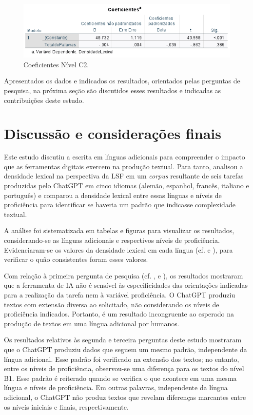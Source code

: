 \documentclass[portuguese]{textolivre}
\begin{document}
\begin{figure}[h!]
    \centering
    \includegraphics[width=0.8\linewidth]{Fig21.png}
    \caption{Coeficientes Nível C2.}
    \label{fig21}
\end{figure}

Apresentados os dados e indicados os resultados, orientados pelas perguntas de pesquisa, na próxima seção são discutidos esses resultados e indicadas as contribuições deste estudo.

\section{Discussão e considerações finais}\label{sec-formato}
Este estudo discutiu a escrita em línguas adicionais para compreender o impacto que as ferramentas digitais exercem na produção textual. Para tanto, analisou a densidade lexical na perspectiva da LSF \cite{halliday_spoken_1985,halliday_grammatical_1993} em um \textit{corpus} resultante de seis tarefas produzidas pelo ChatGPT em cinco idiomas (alemão, espanhol, francês, italiano e português) e comparou a densidade lexical entre essas línguas e níveis de proficiência para identificar se haveria um padrão que indicasse complexidade textual. 

A análise foi sistematizada em tabelas e figuras para visualizar os resultados, considerando-se as línguas adicionais e respectivos níveis de proficiência. Evidenciaram-se os valores da densidade lexical em cada língua (cf.  e ), para verificar o quão consistentes foram esses valores. 

Com relação à primeira pergunta de pesquisa (cf. ,  e ), os resultados mostraram que a ferramenta de IA não é sensível às especificidades das orientações indicadas para a realização da tarefa nem à variável proficiência. O ChatGPT produziu textos com extensão diversa ao solicitado, não considerando os níveis de proficiência indicados. Portanto, é um resultado incongruente ao esperado na produção de textos em uma língua adicional por humanos. 

Os resultados relativos às segunda e terceira perguntas deste estudo mostraram que o ChatGPT produziu dados que seguem um mesmo padrão, independente da língua adicional. Esse padrão foi verificado na extensão dos textos; no entanto, entre os níveis de proficiência, observou-se uma diferença para os textos do nível B1. Esse padrão é reiterado quando se verifica o que acontece em uma mesma língua e níveis de proficiência. Em outras palavras, independente da língua adicional, o ChatGPT não produz textos que revelam diferenças marcantes entre os níveis iniciais e finais, respectivamente.
\end{document}
